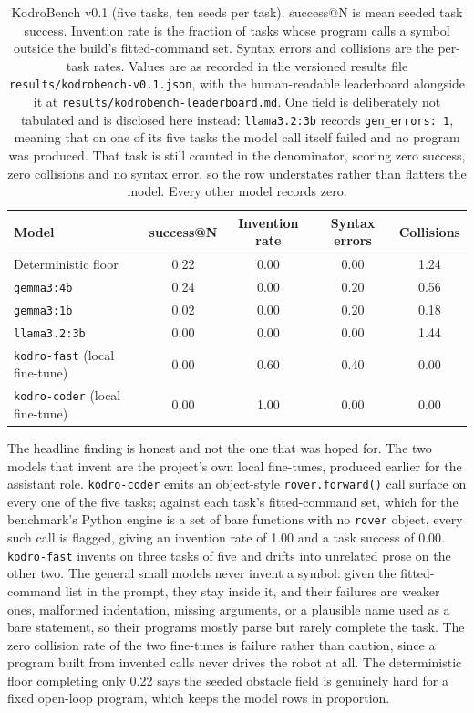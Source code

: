 \documentclass[11pt,a4paper]{report}
\begin{document}
\begin{table}[h]
\centering\small
\renewcommand{\arraystretch}{1.2}
\begin{tabular}{lcccc}
\toprule
Model & success@N & Invention rate & Syntax errors & Collisions \\
\midrule
Deterministic floor & 0.22 & 0.00 & 0.00 & 1.24 \\
\texttt{gemma3:4b} & 0.24 & 0.00 & 0.20 & 0.56 \\
\texttt{gemma3:1b} & 0.02 & 0.00 & 0.20 & 0.18 \\
\texttt{llama3.2:3b} & 0.00 & 0.00 & 0.00 & 1.44 \\
\texttt{kodro-fast} (local fine-tune) & 0.00 & 0.60 & 0.40 & 0.00 \\
\texttt{kodro-coder} (local fine-tune) & 0.00 & 1.00 & 0.00 & 0.00 \\
\bottomrule
\end{tabular}
\caption{KodroBench v0.1 (five tasks, ten seeds per task). success@N is mean seeded task success. Invention rate is the fraction of tasks whose program calls a symbol outside the build's fitted-command set. Syntax errors and collisions are the per-task rates. Values are as recorded in the versioned results file \texttt{results/kodrobench-v0.1.json}, with the human-readable leaderboard alongside it at \texttt{results/kodrobench-leaderboard.md}. One field is deliberately not tabulated and is disclosed here instead: \texttt{llama3.2:3b} records \texttt{gen\_errors: 1}, meaning that on one of its five tasks the model call itself failed and no program was produced. That task is still counted in the denominator, scoring zero success, zero collisions and no syntax error, so the row understates rather than flatters the model. Every other model records zero.}
\label{tab:kodrobench}
\end{table}

The headline finding is honest and not the one that was hoped for. The two models that invent are the project's own local fine-tunes, produced earlier for the assistant role. \texttt{kodro-coder} emits an object-style \texttt{rover.forward()} call surface on every one of the five tasks; against each task's fitted-command set, which for the benchmark's Python engine is a set of bare functions with no \texttt{rover} object, every such call is flagged, giving an invention rate of 1.00 and a task success of 0.00. \texttt{kodro-fast} invents on three tasks of five and drifts into unrelated prose on the other two. The general small models never invent a symbol: given the fitted-command list in the prompt, they stay inside it, and their failures are weaker ones, malformed indentation, missing arguments, or a plausible name used as a bare statement, so their programs mostly parse but rarely complete the task. The zero collision rate of the two fine-tunes is failure rather than caution, since a program built from invented calls never drives the robot at all. The deterministic floor completing only 0.22 says the seeded obstacle field is genuinely hard for a fixed open-loop program, which keeps the model rows in proportion.
\end{document}
